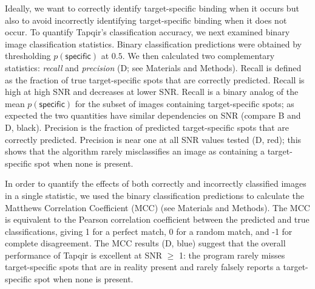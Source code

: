 Ideally, we want to correctly identify target-specific binding when it occurs but also to avoid incorrectly identifying target-specific binding when it does not occur. To quantify Tapqir's classification accuracy, we next examined binary image classification statistics. Binary classification predictions were obtained by thresholding $p(\mathsf{specific})$ at $0.5$. We then calculated two complementary statistics: \textit{recall} and \textit{precision} \citep{Fawcett2006-bq} (D; see Materials and Methods). Recall is defined as the fraction of true target-specific spots that are correctly predicted. Recall is high at high SNR and decreases at lower SNR. Recall is a binary analog of the mean $p(\mathsf{specific})$ for the subset of images containing target-specific spots; as expected the two quantities have similar dependencies on SNR (compare B and D, black). Precision is the fraction of predicted target-specific spots that are correctly predicted. Precision is near one at all SNR values tested (D, red); this shows that the algorithm rarely misclassifies an image as containing a target-specific spot when none is present. 

In order to quantify the effects of both correctly and incorrectly classified images in a single statistic, we used the binary classification predictions to calculate the Matthews Correlation Coefficient (MCC) \citep{Matthews1975-rw} (see Materials and Methods). The MCC is equivalent to the Pearson correlation coefficient between the predicted and true classifications, giving 1 for a perfect match, 0 for a random match, and -1 for complete disagreement. The MCC results (D, blue) suggest that the overall performance of Tapqir is excellent at SNR $\ge$ 1: the program rarely misses target-specific spots that are in reality present and rarely falsely reports a target-specific spot when none is present.  

